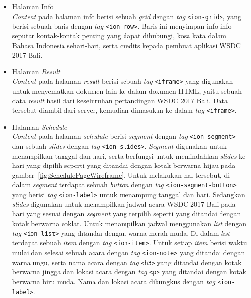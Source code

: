 \begin{enumerate}
\begin{itemize}
				\item Halaman Info \\
					\textit{Content} pada halaman info berisi sebuah \textit{grid} dengan \textit{tag} \texttt{<ion-grid>}, yang berisi sebuah baris dengan \textit{tag} \texttt{<ion-row>}. Baris ini menyimpan info-info seputar kontak-kontak penting yang dapat dihubungi, kosa kata dalam Bahasa Indonesia sehari-hari, serta credits kepada pembuat aplikasi WSDC 2017 Bali.
					
				\item Halaman \textit{Result}\\
					\textit{Content} pada halaman \textit{result} berisi sebuah \textit{tag} \texttt{<iframe>} yang digunakan untuk menyematkan dokumen lain ke dalam dokumen HTML, yaitu sebuah data \textit{result} hasil dari keseluruhan pertandingan WSDC 2017 Bali. Data tersebut diambil dari server, kemudian dimasukan ke dalam \textit{tag} \texttt{<iframe>}. 
					
				\item Halaman \textit{Schedule} \\
					\textit{Content} pada halaman \textit{schedule} berisi \textit{segment} dengan \textit{tag} \texttt{<ion-segment>} dan sebuah \textit{slides} dengan \textit{tag} \texttt{<ion-slides>}. \textit{Segment} digunakan untuk menampilkan tanggal dan hari, serta berfungsi untuk memindahkan \textit{slides} ke hari yang dipilih seperti yang ditandai dengan kotak berwarna hijau pada gambar~\ref{fig:SchedulePageWireframe}. Untuk melakukan hal tersebut, di dalam \textit{segment} terdapat sebuah \textit{button} dengan \textit{tag} \texttt{<ion-segment-button>} yang berisi \textit{tag} \texttt{<ion-label>} untuk menampung tanggal dan hari. 
					Sedangkan \textit{slides} digunakan untuk menampilkan jadwal acara WSDC 2017 Bali pada hari yang sesuai dengan \textit{segment} yang terpilih seperti yang ditandai dengan kotak berwarna coklat. Untuk menampilkan jadwal menggunakan \textit{list} dengan \textit{tag} \texttt{<ion-list>} yang ditandai dengan warna merah muda. Di dalam \textit{list} terdapat sebuah \textit{item} dengan \textit{tag} \texttt{<ion-item>}. Untuk setiap \textit{item} berisi waktu mulai dan selesai sebuah acara dengan \textit{tag} \texttt{<ion-note>} yang ditandai dengan warna ungu, serta nama acara dengan \textit{tag} \texttt{<h3>} yang ditandai dengan kotak berwarna jingga dan lokasi acara dengan \textit{tag} \texttt{<p>} yang ditandai dengan kotak berwarna biru muda. Nama dan lokasi acara dibungkus dengan \textit{tag} \texttt{<ion-label>}.
					

\end{itemize}
\end{enumerate}
